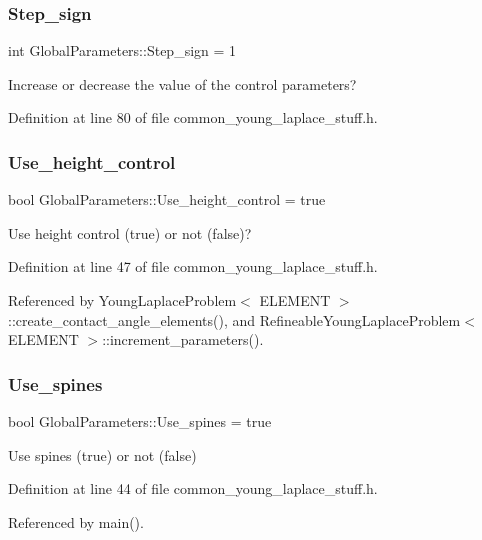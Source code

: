 \subsubsection{\texorpdfstring{Step\+\_\+sign}{Step\_sign}}
{\footnotesize\ttfamily int Global\+Parameters\+::\+Step\+\_\+sign = 1}



Increase or decrease the value of the control parameters? 



Definition at line 80 of file common\+\_\+young\+\_\+laplace\+\_\+stuff.\+h.

\mbox{\label{namespaceGlobalParameters_a624713d35bc418b2d5fa79f4d385a27a}} 
\subsubsection{\texorpdfstring{Use\+\_\+height\+\_\+control}{Use\_height\_control}}
{\footnotesize\ttfamily bool Global\+Parameters\+::\+Use\+\_\+height\+\_\+control = true}



Use height control (true) or not (false)? 



Definition at line 47 of file common\+\_\+young\+\_\+laplace\+\_\+stuff.\+h.



Referenced by Young\+Laplace\+Problem$<$ E\+L\+E\+M\+E\+N\+T $>$\+::create\+\_\+contact\+\_\+angle\+\_\+elements(), and Refineable\+Young\+Laplace\+Problem$<$ E\+L\+E\+M\+E\+N\+T $>$\+::increment\+\_\+parameters().

\mbox{\label{namespaceGlobalParameters_a7cd7766fae9d0ca421d7e24677be3131}} 
\subsubsection{\texorpdfstring{Use\+\_\+spines}{Use\_spines}}
{\footnotesize\ttfamily bool Global\+Parameters\+::\+Use\+\_\+spines = true}



Use spines (true) or not (false) 



Definition at line 44 of file common\+\_\+young\+\_\+laplace\+\_\+stuff.\+h.



Referenced by main().

